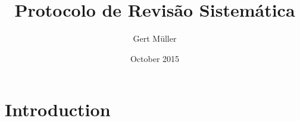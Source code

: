 \documentclass{article}
\title{Protocolo de Revisão Sistemática}
\author{Gert Müller}
\date{October 2015}
\begin{document}
\maketitle

\section{Introduction}
\end{document}
